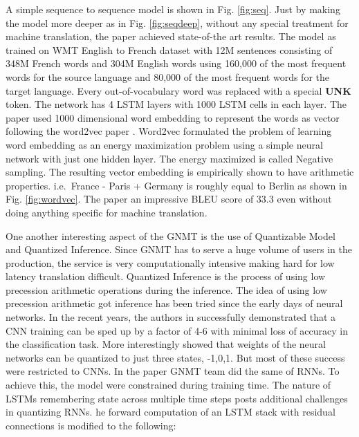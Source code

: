 \documentclass[a4paper]{article}
\begin{document}
A  simple  sequence to sequence  model is shown in Fig.  \ref{fig:seq}.  Just by
making  the model more deeper as in Fig.  \ref{fig:seqdeep}, without any special
treatment for machine translation, the  paper achieved state-of-the art results.
The  model  as trained on  WMT English  to  French  dataset with  12M  sentences
consisting of 348M French words and 304M English words using 160,000 of the most
frequent words for the source language and 80,000 of the most frequent words for
the  target  language. Every out-of-vocabulary  word was replaced with a special
\textbf{UNK} token. The network has 4 LSTM layers with 1000  LSTM cells in  each
layer. The paper used 1000 dimensional word embedding  to represent the words as
vector  following  the  word2vec paper  \cite{mikolov2013distributed}.  Word2vec
formulated  the  problem of  learning word embedding  as an energy  maximization
problem using a simple neural  network  with just one  hidden  layer. The energy
maximized is  called  Negative  sampling.  The  resulting  vector  embedding  is
empirically shown  to  have arithmetic  properties.  i.e.  $\,$France -  Paris +
Germany is roughly equal to Berlin as shown in Fig. \ref{fig:wordvec}. The paper
an  impressive BLEU score  of  33.3 even  without  doing  anything  specific for
machine translation.

One another interesting aspect of the GNMT is the use  of Quantizable  Model and
Quantized  Inference.  Since GNMT has to  serve  a  huge volume of users  in the
production,  the service is  very computationally intensive  making hard for low
latency translation difficult.  Quantized Inference is  the process of using low
precession  arithmetic operations during  the inference. The idea of  using  low
precession arithmetic  got  inference has  been  tried  since  the early days of
neural  networks.  In  the recent  years, the  authors in \cite{wu2016quantized}
successfully demonstrated that a CNN training can  be sped up by a factor of 4-6
with minimal  loss  of accuracy in  the classification task. More  interestingly
\cite{li2016ternary} showed that weights of the neural networks can be quantized
to just three states, -1,0,1. But most of these success were restricted to CNNs.
In the paper GNMT  team  did the same  of RNNs. To  achieve this, the model were
constrained  during  training time. The nature of LSTMs remembering state across
multiple time steps posts additional challenges  in quantizing RNNs.  he forward
computation  of  an LSTM  stack with  residual connections  is modified  to  the
following:
\end{document}

